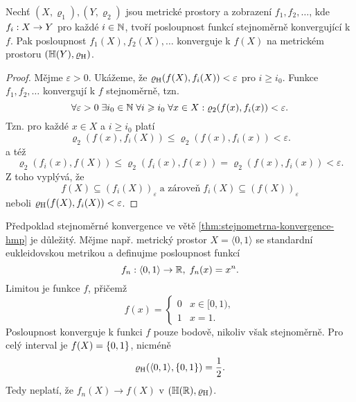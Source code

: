 \begin{theorem}\label{thm:stejnometrna-konvergence-hmp}
    Nechť $(X,\varrho_1),(Y,\varrho_2)$ jsou metrické prostory a zobrazení $f_1,f_2,\ldots$, kde $f_i:X \rightarrow Y$ pro každé $i\in\mathbb{N}$, tvoří posloupnost funkcí stejnoměrně konvergující k $f$. Pak posloupnost $f_1(X),f_2(X),\ldots$ konverguje k $f(X)$ na metrickém prostoru $(\mathbb{H}(Y),\varrho_\textup{H})$.
\end{theorem}
\begin{proof}
    Mějme $\varepsilon>0$. Ukážeme, že $\varrho_\textup{H}(f(X),f_i(X))<\varepsilon$ pro $i\geqslant i_0$. Funkce $f_1,f_2,\ldots$ konvergují k $f$ stejnoměrně, tzn.
    \[\forall\varepsilon>0\;\exists i_0\in\mathbb{N}\;\forall i\geqslant i_0\;\forall x\in X:\varrho_2(f(x),f_i(x))<\varepsilon.\]
    Tzn. pro každé $x\in X$ a $i\geqslant i_0$ platí
    \[\varrho_2(f(x),f_i(X))\leqslant\varrho_2(f(x),f_i(x))<\varepsilon.\]
    a též
    \[\varrho_2(f_i(x),f(X))\leqslant\varrho_2(f_i(x),f(x))=\varrho_2(f(x),f_i(x))<\varepsilon.\]
    Z toho vyplývá, že
    \[f(X)\subseteq (f_i(X))_\varepsilon\;\text{a zároveň}\;f_i(X)\subseteq (f(X))_\varepsilon\]
    neboli $\varrho_\textup{H}(f(X),f_i(X))<\varepsilon$.
\end{proof}
\begin{remark}
    Předpoklad stejnoměrné konvergence ve větě \ref{thm:stejnometrna-konvergence-hmp} je důležitý. Mějme např. metrický prostor $X=\langle0,1\rangle$ se standardní eukleidovskou metrikou a definujme posloupnost funkcí
    \[f_n:\langle0,1\rangle \rightarrow \mathbb{R},\;f_n(x)=x^n.\]
    Limitou je funkce $f$, přičemž
    \[f(x) = \begin{cases}
        0 & x \in [0,1),\\
        1 & x = 1.
        \end{cases}\]
    Posloupnost konverguje k funkci $f$ pouze bodově, nikoliv však stejnoměrně. Pro celý interval je $f(X)=\left\{0,1\right\}$, nicméně
    \[\varrho_\textup{H}(\langle0,1\rangle,\left\{0,1\right\})=\dfrac{1}{2}.\]
    Tedy neplatí, že $f_n(X)\to f(X)$ v $(\mathbb{H}(\mathbb{R}),\varrho_\textup{H})$.
\end{remark}